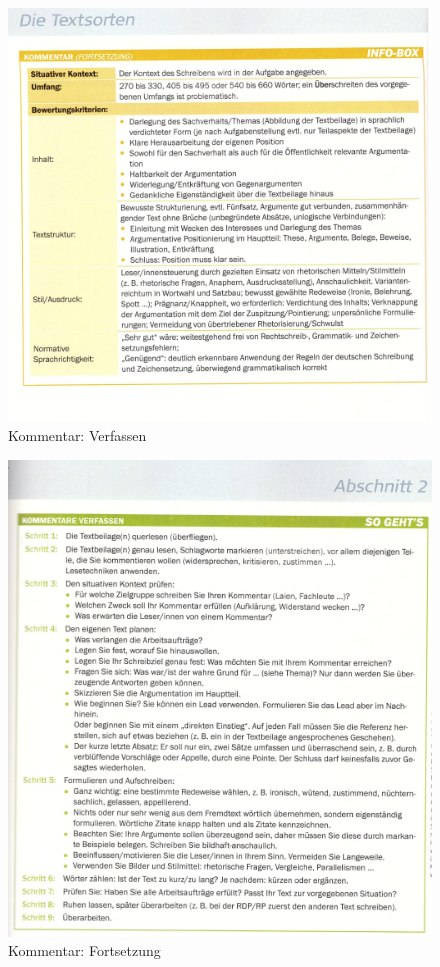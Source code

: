 \begin{figure}[h]
    \centering
    \includegraphics[scale=0.8]{./pics/Screenshot from 2023-02-06 12-27-54.png}
    \caption{Kommentar: Verfassen}
    \label{fig:impl:Kommentar2}
\end{figure}
\begin{figure}[h]
    \centering
    \includegraphics[scale=0.8]{./pics/Screenshot from 2023-02-06 12-28-08.png}
    \caption{Kommentar: Fortsetzung}
    \label{fig:impl:Kommentar3}
\end{figure}
